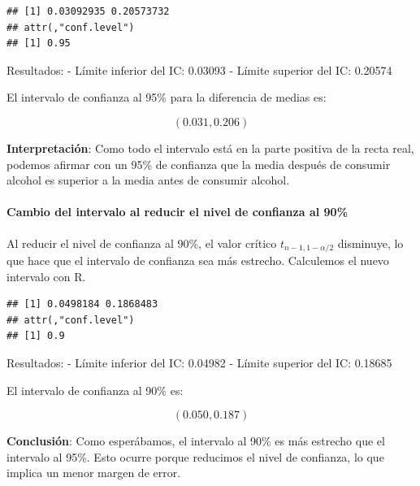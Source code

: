 \documentclass[
]{article}
\newenvironment{Shaded}{\begin{snugshade}}{\end{snugshade}}
\newcommand{\AttributeTok}[1]{\textcolor[rgb]{0.13,0.29,0.53}{#1}}
\newcommand{\CommentTok}[1]{\textcolor[rgb]{0.56,0.35,0.01}{\textit{#1}}}
\newcommand{\ConstantTok}[1]{\textcolor[rgb]{0.56,0.35,0.01}{#1}}
\newcommand{\FloatTok}[1]{\textcolor[rgb]{0.00,0.00,0.81}{#1}}
\newcommand{\FunctionTok}[1]{\textcolor[rgb]{0.13,0.29,0.53}{\textbf{#1}}}
\newcommand{\NormalTok}[1]{#1}
\newcommand{\OtherTok}[1]{\textcolor[rgb]{0.56,0.35,0.01}{#1}}
\newcommand{\SpecialCharTok}[1]{\textcolor[rgb]{0.81,0.36,0.00}{\textbf{#1}}}
\begin{document}
\begin{verbatim}
## [1] 0.03092935 0.20573732
## attr(,"conf.level")
## [1] 0.95
\end{verbatim}

Resultados:
- Límite inferior del IC: 0.03093
- Límite superior del IC: 0.20574

El intervalo de confianza al 95\% para la diferencia de medias es:

\[ (0.031, 0.206) \]

\textbf{Interpretación}: Como todo el intervalo está en la parte positiva de la recta real, podemos afirmar con un 95\% de confianza que la media después de consumir alcohol es superior a la media antes de consumir alcohol.

\paragraph{Cambio del intervalo al reducir el nivel de confianza al 90\%}\label{cambio-del-intervalo-al-reducir-el-nivel-de-confianza-al-90}

Al reducir el nivel de confianza al 90\%, el valor crítico \(t_{n-1, 1-\alpha/2}\) disminuye, lo que hace que el intervalo de confianza sea más estrecho. Calculemos el nuevo intervalo con R.

\begin{Shaded}
\end{Shaded}

\begin{verbatim}
## [1] 0.0498184 0.1868483
## attr(,"conf.level")
## [1] 0.9
\end{verbatim}

Resultados:
- Límite inferior del IC: 0.04982
- Límite superior del IC: 0.18685

El intervalo de confianza al 90\% es:

\[ (0.050, 0.187) \]

\textbf{Conclusión}: Como esperábamos, el intervalo al 90\% es más estrecho que el intervalo al 95\%. Esto ocurre porque reducimos el nivel de confianza, lo que implica un menor margen de error.
\end{document}
